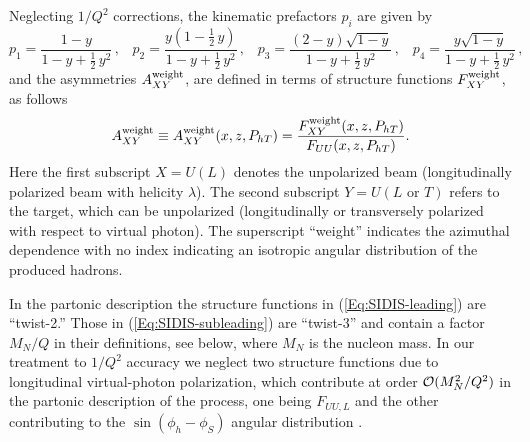 \documentclass[a4paper,11pt]{article}
\newcommand{\red}[1]{{\color{red} #1}}
\newcommand{\be}{\begin{equation}}
\newcommand{\ee}{\end{equation}}
\newcommand{\ba}{\begin{eqnarray}}
\newcommand{\ea}{\end{eqnarray}}
\newcommand{\slim}{\mskip 1.5mu}       %
\newcommand{\AP}[1]{\red{#1}}
\def\Phperp{P_{hT}}
\begin{document}
Neglecting $1/Q^2$ corrections, the kinematic prefactors $p_i$ are given by 
\be\label{Eq:y-prefactors}
	p_1 = \frac{1-y}{1-y+\frac12\,y^2} 		\, , \;\;\;
	p_2 = \frac{y(1-\frac12\,y)}{1-y+\frac12\,y^2}	\, , \;\;\;
	p_3 = \frac{(2-y)\sqrt{1-y}}{1-y+\frac12\,y^2} 	\, , \;\;\;
	p_4 = \frac{y\sqrt{1-y}}{1-y+\frac12\,y^2}     	\, ,
\ee
and the asymmetries \AP{$A_{XY}^{\rm weight}$,  are defined in terms of structure functions $F_{XY}^{\rm weight}$, as follows}
\be
	A_{XY}^{\rm weight}\equiv A_{XY}^{\rm weight}(x,z,\Phperp)=
	\frac{F_{XY}^{\rm weight}(x,z,\Phperp)}{F_{UU}(x,z,\Phperp)}.
\ee
Here the first subscript $X=U(L)$ denotes the unpolarized beam
(longitudinally polarized beam with helicity $\lambda$). The second 
subscript $Y=U(L\text{ or }T)$ refers to the target, which can be unpolarized
(longitudinally or transversely polarized with respect to virtual photon).
The superscript ``weight'' indicates the azimuthal dependence with no index 
indicating an isotropic angular distribution of the produced hadrons.

In the partonic description the structure functions in 
(\ref{Eq:SIDIS-leading})    are ``twist-2.'' Those in
(\ref{Eq:SIDIS-subleading}) are ``twist-3'' and contain a
factor $M_N/Q$ in their definitions, see below, 
where $M_N$ is the nucleon mass. In our treatment to $1/Q^2$ 
accuracy we neglect two structure functions due to longitudinal virtual-photon 
polarization, which contribute at order ${\cal O}(M_N^2/Q^2)$ in the 
partonic description of the process, one being $F_{UU,L}$ and the other 
contributing to the $\sin(\phi_h-\phi_S)$ angular distribution 
\cite{Bacchetta:2006tn}.
\end{document}
